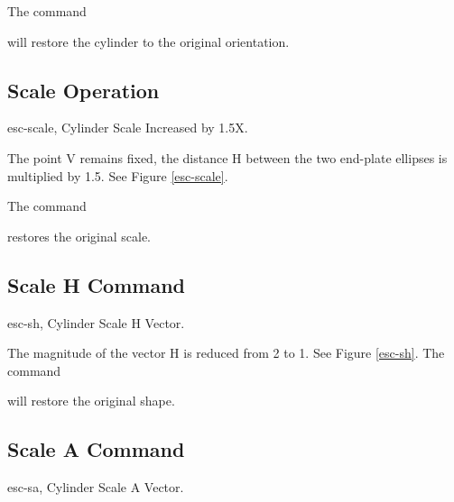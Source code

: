 The command


will restore the cylinder to the original orientation.

\subsection{Scale Operation}
\mfig esc-scale, Cylinder Scale Increased by 1.5X.


The point V remains fixed, the distance H between the two end-plate ellipses
is multiplied by 1.5.
See Figure \ref{esc-scale}.

The command


restores the original scale.

\subsection{Scale H Command}
\mfig esc-sh, Cylinder Scale H Vector.


The magnitude of the vector H is reduced from 2 to 1.
See Figure \ref{esc-sh}.  The command


will restore the original shape.

\subsection{Scale A Command}
\mfig esc-sa, Cylinder Scale A Vector.


